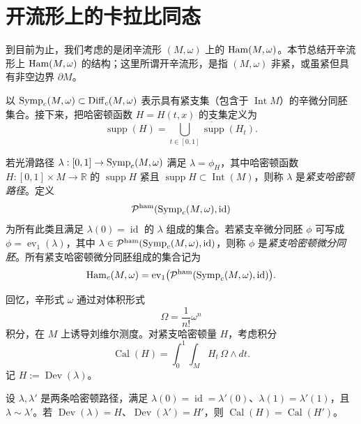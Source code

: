 \section{开流形上的卡拉比同态}
\label{sec:calabi-open-manifolds}

到目前为止，我们考虑的是闭辛流形 $(M,\omega)$ 上的 $\operatorname{Ham}(M,\omega)$。本节总结开辛流形上 $\operatorname{Ham}(M,\omega)$ 的结构；这里所谓开辛流形，是指 $(M,\omega)$ 非紧，或虽紧但具有非空边界 $\partial M$。

以 $\operatorname{Symp}_c(M,\omega)\subset\operatorname{Diff}_c(M,\omega)$ 表示具有紧支集（包含于 $\operatorname{Int}M$）的辛微分同胚集合。接下来，把哈密顿函数 $H=H(t,x)$ 的支集定义为
\[
  \operatorname{supp}(H)
  =\overline{\bigcup_{t\in[0,1]}\operatorname{supp}(H_t)}.
\]

\begin{definition}
\label{def:compactly-supported-hamiltonian-path}
若光滑路径 $\lambda:[0,1]\to\operatorname{Symp}_c(M,\omega)$ 满足 $\lambda=\phi_H$，其中哈密顿函数
$H:[0,1]\times M\to\mathbb R$ 的 $\operatorname{supp}H$ 紧且
$\operatorname{supp}H\subset\operatorname{Int}(M)$，则称 $\lambda$ 是\emph{紧支哈密顿路径}。定义
\[
  \mathcal P^{\mathrm{ham}}(\operatorname{Symp}_c(M,\omega),\operatorname{id})
\]
为所有此类且满足 $\lambda(0)=\operatorname{id}$ 的 $\lambda$ 组成的集合。若紧支辛微分同胚 $\phi$ 可写成
$\phi=\operatorname{ev}_1(\lambda)$，其中
$\lambda\in\mathcal P^{\mathrm{ham}}(\operatorname{Symp}_c(M,\omega),\operatorname{id})$，则称 $\phi$ 是\emph{紧支哈密顿微分同胚}。所有紧支哈密顿微分同胚组成的集合记为
\[
  \operatorname{Ham}_c(M,\omega)
  =\operatorname{ev}_1\bigl(
    \mathcal P^{\mathrm{ham}}(\operatorname{Symp}_c(M,\omega),\operatorname{id})
  \bigr).
\]
\end{definition}

回忆，辛形式 $\omega$ 通过对体积形式
\[
  \Omega=\frac1{n!}\omega^n
\]
积分，在 $M$ 上诱导刘维尔测度。对紧支哈密顿量 $H$，考虑积分
\[
  \operatorname{Cal}(H)=\int_0^1\int_M H_t\,\Omega\wedge dt.
\]
记 $H:=\operatorname{Dev}(\lambda)$。

\begin{lemma}
\label{lem:calabi-path-homotopy}
设 $\lambda,\lambda'$ 是两条哈密顿路径，满足
$\lambda(0)=\operatorname{id}=\lambda'(0)$、$\lambda(1)=\lambda'(1)$，且
$\lambda\sim\lambda'$。若
$\operatorname{Dev}(\lambda)=H$、$\operatorname{Dev}(\lambda')=H'$，则
$\operatorname{Cal}(H)=\operatorname{Cal}(H')$。
\end{lemma}

